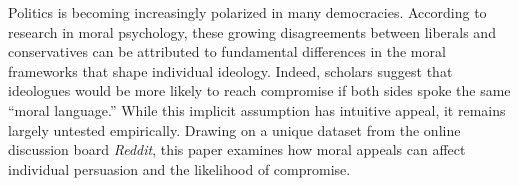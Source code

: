 Politics is becoming increasingly polarized in many democracies. According to research in moral psychology, these growing disagreements between liberals and conservatives can be attributed to fundamental differences in the moral frameworks that shape individual ideology. Indeed, scholars suggest that ideologues would be more likely to reach compromise if both sides spoke the same ``moral language.'' While this implicit assumption has intuitive appeal, it remains largely untested empirically. Drawing on a unique dataset from the online discussion board \emph{Reddit}, this paper examines how moral appeals can affect individual persuasion and the likelihood of compromise. %